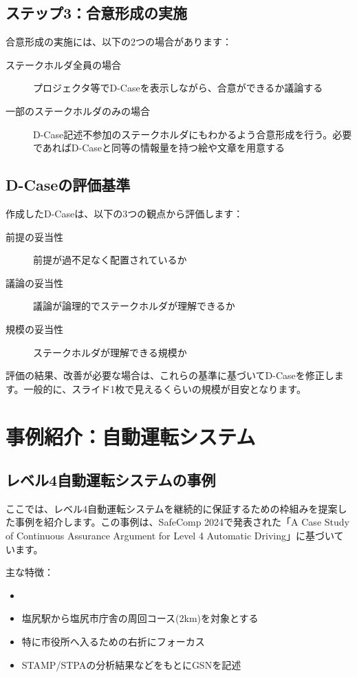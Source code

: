 \subsection{ステップ3：合意形成の実施}

合意形成の実施には、以下の2つの場合があります：

\begin{description}
    \item[ステークホルダ全員の場合] プロジェクタ等でD-Caseを表示しながら、合意ができるか議論する
    \item[一部のステークホルダのみの場合] D-Case記述不参加のステークホルダにもわかるよう合意形成を行う。必要であればD-Caseと同等の情報量を持つ絵や文章を用意する
\end{description}

\subsection{D-Caseの評価基準}

作成したD-Caseは、以下の3つの観点から評価します：

\begin{description}
    \item[前提の妥当性] 前提が過不足なく配置されているか
    \item[議論の妥当性] 議論が論理的でステークホルダが理解できるか
    \item[規模の妥当性] ステークホルダが理解できる規模か
\end{description}

評価の結果、改善が必要な場合は、これらの基準に基づいてD-Caseを修正します。一般的に、スライド1枚で見えるくらいの規模が目安となります。

\section{事例紹介：自動運転システム}

\subsection{レベル4自動運転システムの事例}

ここでは、レベル4自動運転システムを継続的に保証するための枠組みを提案した事例を紹介します。この事例は、SafeComp 2024で発表された「A Case Study of Continuous Assurance Argument for Level 4 Automatic Driving」に基づいています。

主な特徴：

\begin{itemize}
    \item\item 塩尻駅から塩尻市庁舎の周回コース(2km)を対象とする
    \item 特に市役所へ入るための右折にフォーカス
    \item STAMP/STPAの分析結果などをもとにGSNを記述
\end{itemize}

